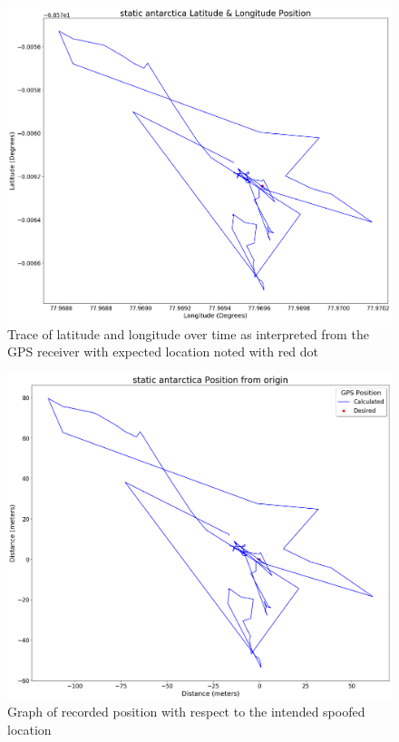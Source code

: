 \begin{figure}[h]
    \begin{centering}
        \includegraphics[width=14cm,keepaspectratio]{Figures/2021_3_30_static_antarctica Lat long position.png}
        \caption{Trace of latitude and longitude over time as interpreted from the GPS receiver with expected location noted with red dot}
        \label{fig:antarcticaStaticCoord}
    \end{centering}
\end{figure}

\begin{figure}[h]
    \begin{centering}
        \includegraphics[width=14cm,keepaspectratio]{Figures/2021_3_30_static_antarctica Position from origin.png}
        \caption{Graph of recorded position with respect to the intended spoofed location}
        \label{fig:antarcticaStaticPosition}
    \end{centering}
\end{figure}

